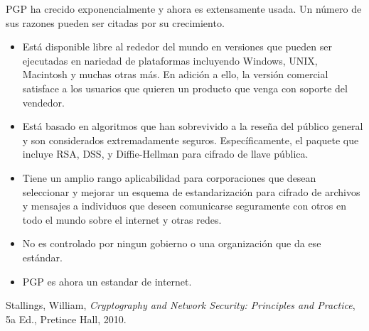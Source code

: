 \documentclass[11pt,letterpaper]{article}
\begin{document}
PGP ha crecido exponencialmente y ahora es extensamente usada. Un número de sus razones pueden ser citadas
por su crecimiento.

\begin{itemize}
    \item Está disponible libre al rededor del mundo en versiones que pueden ser ejecutadas en nariedad de plataformas
    incluyendo Windows, UNIX, Macintosh y muchas otras más. En adición a ello, la versión comercial satisface 
    a los usuarios que quieren un producto que venga con soporte del vendedor.
    \item Está basado en algoritmos que han sobrevivido a la reseña del público general y son considerados
    extremadamente seguros. Específicamente, el paquete que incluye RSA, DSS, y Diffie-Hellman para cifrado
    de llave pública.
    \item Tiene un amplio rango aplicabilidad para corporaciones que desean seleccionar y mejorar un
    esquema de estandarización para cifrado de archivos y mensajes a individuos que deseen comunicarse 
    seguramente con otros en todo el mundo sobre el internet y otras redes.
    \item No es controlado por ningun gobierno o una organización que da ese estándar.
    \item PGP es ahora un estandar de internet.
\end{itemize}





\begin{thebibliography}{}

\bibitem{}
Stallings, William,
\textit{Cryptography and Network Security: Principles and Practice},
5a Ed., Pretince Hall, 2010.

\end{thebibliography}
\end{document}
